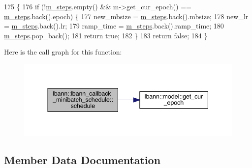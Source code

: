 \begin{DoxyCode}
175                                                             \{
176   \textcolor{keywordflow}{if} (!\hyperlink{classlbann_1_1lbann__callback__minibatch__schedule_a05084eeba07e54fa11eed1a414b7aeeb}{m\_steps}.empty() && m->get\_cur\_epoch() == \hyperlink{classlbann_1_1lbann__callback__minibatch__schedule_a05084eeba07e54fa11eed1a414b7aeeb}{m\_steps}.back().epoch) \{
177     new\_mbsize = \hyperlink{classlbann_1_1lbann__callback__minibatch__schedule_a05084eeba07e54fa11eed1a414b7aeeb}{m\_steps}.back().mbsize;
178     new\_lr = \hyperlink{classlbann_1_1lbann__callback__minibatch__schedule_a05084eeba07e54fa11eed1a414b7aeeb}{m\_steps}.back().lr;
179     ramp\_time = \hyperlink{classlbann_1_1lbann__callback__minibatch__schedule_a05084eeba07e54fa11eed1a414b7aeeb}{m\_steps}.back().ramp\_time;
180     \hyperlink{classlbann_1_1lbann__callback__minibatch__schedule_a05084eeba07e54fa11eed1a414b7aeeb}{m\_steps}.pop\_back();
181     \textcolor{keywordflow}{return} \textcolor{keyword}{true};
182   \}
183   \textcolor{keywordflow}{return} \textcolor{keyword}{false};
184 \}
\end{DoxyCode}
Here is the call graph for this function\+:\nopagebreak
\begin{figure}[H]
\begin{center}
\leavevmode
\includegraphics[width=344pt]{classlbann_1_1lbann__callback__minibatch__schedule_af95cbe83a587590219174cb17828ea4b_cgraph}
\end{center}
\end{figure}


\subsection{Member Data Documentation}
\mbox{\label{classlbann_1_1lbann__callback__minibatch__schedule_a05084eeba07e54fa11eed1a414b7aeeb}} 
